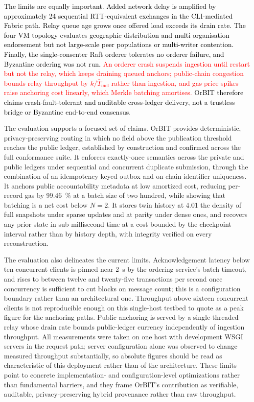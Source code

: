 \documentclass[final,5p,times,twocolumn]{elsarticle}
\begin{document}
\textcolor{black}{The limits are equally important. Added network delay is amplified by approximately 24 sequential RTT-equivalent exchanges in the CLI-mediated Fabric path. Relay queue age grows once offered load exceeds its drain rate. The four-VM topology evaluates geographic distribution and multi-organisation endorsement but not large-scale peer populations or multi-writer contention. Finally, the single-consenter Raft orderer tolerates no orderer failure, and Byzantine ordering was not run.} \textcolor{red}{An orderer crash suspends ingestion until restart but not the relay, which keeps draining queued anchors; public-chain congestion bounds relay throughput by $k/\bar{T}_{\mathrm{incl}}$ rather than ingestion, and gas-price spikes raise anchoring cost linearly, which Merkle batching amortises.} \textcolor{black}{OrBIT therefore claims crash-fault-tolerant and auditable cross-ledger delivery, not a trustless bridge or Byzantine end-to-end consensus.}

\iffalse

The evaluation supports a focused set of claims. OrBIT provides deterministic,
privacy-preserving routing in which no field above the publication threshold
reaches the public ledger, established by construction and confirmed across the
full conformance suite. It enforces exactly-once semantics across the private
and public ledgers under sequential and concurrent duplicate submission, through
the combination of an idempotency-keyed outbox and on-chain identifier
uniqueness. It anchors public accountability metadata at low amortized cost,
reducing per-record gas by \SI{99.46}{\percent} at a batch size of two hundred,
while showing that batching is a net cost below $N=2$. It stores twin history at
\SI{4.01}{\times} the density of full snapshots under sparse updates and at
parity under dense ones, and recovers any prior state in sub-millisecond time at
a cost bounded by the checkpoint interval rather than by history depth, with
integrity verified on every reconstruction.

The evaluation also delineates the current limits. Acknowledgement latency below
ten concurrent clients is pinned near \SI{2}{\second} by the ordering service's
batch timeout, and rises to between twelve and twenty-five transactions per
second once concurrency is sufficient to cut blocks on message count; this is a
configuration boundary rather than an architectural one. Throughput above
sixteen concurrent clients is not reproducible enough on this single-host
testbed to quote as a peak figure for the anchoring paths. Public anchoring is
served by a single-threaded relay whose drain rate bounds public-ledger currency
independently of ingestion throughput. All measurements were taken on one host
with development WSGI servers in the request path; server configuration alone
was observed to change measured throughput substantially, so absolute figures
should be read as characteristic of this deployment rather than of the
architecture. These limits point to concrete implementation- and
configuration-level optimizations rather than fundamental barriers, and they
frame OrBIT's contribution as verifiable, auditable, privacy-preserving hybrid
provenance rather than raw throughput.
\end{document}
